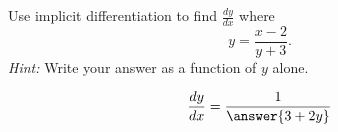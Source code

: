 \documentclass{ximera}
\author{Steven Gubkin\and Nela Lakos}
\begin{document}
\begin{exercise}

Use implicit differentiation to find $\frac{dy}{dx}$ where
\[
y = \frac{x-2}{y+3}.
\]
\emph{Hint:} Write your answer as a function of $y$ alone.
\begin{prompt}
\[
\frac{dy}{dx} =\frac{1}{ \answer{3+2y}}
\]
\end{prompt}
\end{exercise}
\end{document}
